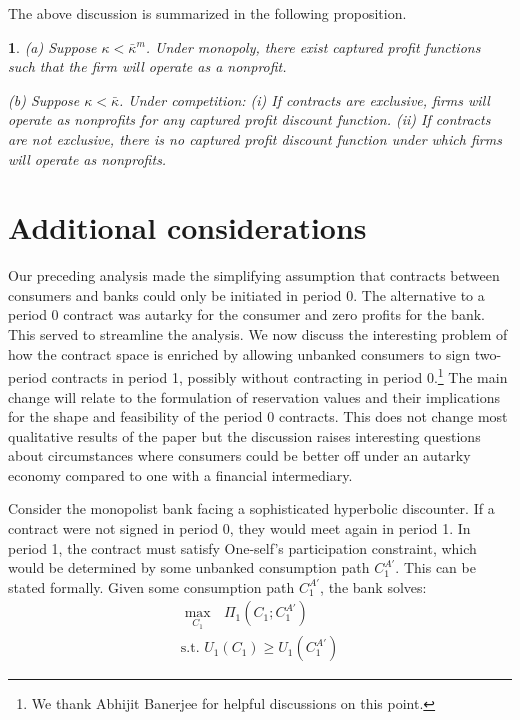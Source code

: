 \documentclass[11pt,english]{article}
\theoremstyle{plain}
\newtheorem{prop}{\protect\propositionname}
\theoremstyle{definition}
\providecommand{\propositionname}{Proposition}
\begin{document}
The above discussion is summarized in the following proposition.
\begin{prop}
(a) Suppose $\kappa<\bar{\kappa}^{m}$. Under monopoly, there exist
captured profit functions such that the firm will operate as a nonprofit.

(b) Suppose $\kappa<\bar{\kappa}$. Under competition: (i) If contracts
are exclusive, firms will operate as nonprofits for any captured profit
discount function. (ii) If contracts are not exclusive, there is no
captured profit discount function under which firms will operate as
nonprofits.
\end{prop}

\section{Additional considerations}

Our preceding analysis made the simplifying assumption that contracts
between consumers and banks could only be initiated in period 0. The
alternative to a period 0 contract was autarky for the consumer and
zero profits for the bank. This served to streamline the analysis.
We now discuss the interesting problem of how the contract space is
enriched by allowing unbanked consumers to sign two-period contracts
in period 1, possibly without contracting in period 0.\footnote{We thank Abhijit Banerjee for helpful discussions on this point.}
The main change will relate to the formulation of reservation values
and their implications for the shape and feasibility of the period
0 contracts. This does not change most qualitative results of the
paper but the discussion raises interesting questions about circumstances
where consumers could be better off under an autarky economy compared
to one with a financial intermediary.

Consider the monopolist bank facing a sophisticated hyperbolic discounter.
If a contract were not signed in period 0, they would meet again in
period 1. In period 1, the contract must satisfy One-self's participation
constraint, which would be determined by some unbanked consumption
path $C_{1}^{A'}$. This can be stated formally. Given some consumption
path $C_{1}^{A'}$, the bank solves: 
\begin{align*}
\underset{C_{1}}{\max}\text{ }{\Pi_{1}\left(C_{1};C_{1}^{A'}\right)}\\
\text{s.t. }U_{1}\left(C_{1}\right)\geq U_{1}\left(C_{1}^{A'}\right)
\end{align*}
\end{document}
